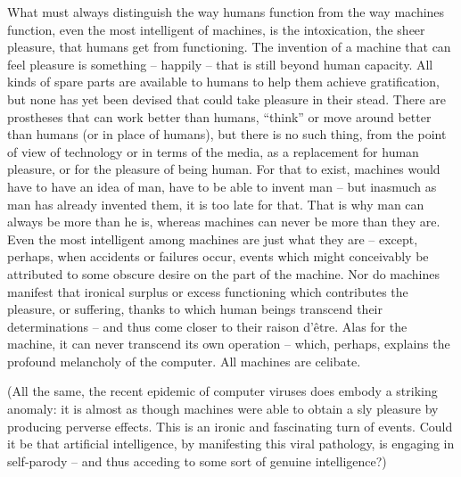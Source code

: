 \documentclass[10pt,twoside,openany]{memoir}
\begin{document}
What must always distinguish the way humans function from the way machines function, even the most intelligent of machines, is the intoxication, the sheer pleasure, that humans get from functioning. The invention of a machine that can feel pleasure is something -- happily -- that is still beyond human capacity. All kinds of spare parts are available to humans to help them achieve gratification, but none has yet been devised that could take pleasure in their stead. There are prostheses that can work better than humans, ``think'' or move around better than humans (or in place of humans), but there is no such thing, from the point of view of technology or in terms of the media, as a replacement for human pleasure, or for the pleasure of being human. For that to exist, machines would have to have an idea of man, have to be able to invent man -- but inasmuch as man has already invented them, it is too late for that. That is why man can always be more than he is, whereas machines can never be more than they are. Even the most intelligent among machines are just what they are -- except, perhaps, when accidents or failures occur, events which might conceivably be attributed to some obscure desire on the part of the machine. Nor do machines manifest that ironical surplus or excess functioning which contributes the pleasure, or suffering, thanks to which human beings transcend their determinations -- and thus come closer to their raison d'\^etre. Alas for the machine, it can never transcend its own operation -- which, perhaps, explains the profound melancholy of the computer. All machines are celibate. 

(All the same, the recent epidemic of computer viruses does embody a striking anomaly: it is almost as though machines were able to obtain a sly pleasure by producing perverse effects. This is an ironic and fascinating turn of events. Could it be that artificial intelligence, by manifesting this viral pathology, is engaging in self-parody -- and thus acceding to some sort of genuine intelligence?)
\end{document}
